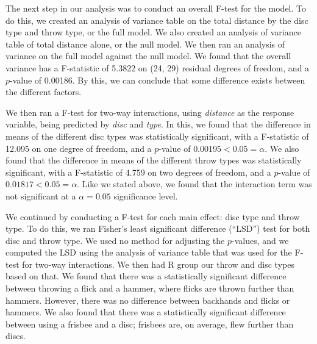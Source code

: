 \documentclass[letter,12pt]{article}
\begin{document}
  The next step in our analysis was to conduct an overall F-test for the model. To do this, we created an analysis of variance table on the total distance by the disc type and throw type, or the full model. We also created an analysis of variance table of total distance alone, or the null model. We then ran an analysis of variance on the full model against the null model. We found that the overall variance has a F-statistic of 5.3822 on (24, 29) residual degrees of freedom, and a $p$-value of 0.00186. By this, we can conclude that some difference exists between the different factors.\par
  We then ran a F-test for two-way interactions, using \textit{distance} as the response variable, being predicted by \textit{disc} and \textit{type}. In this, we found that the difference in means of the different disc types was statistically significant, with a F-statistic of 12.095 on one degree of freedom, and a $p$-value of $0.00195 < 0.05 = \alpha$. We also found that the difference in means of the different throw types was statistically significant, with a F-statistic of 4.759 on two degrees of freedom, and a $p$-value of $0.01817 < 0.05 = \alpha$. Like we stated above, we found that the interaction term was not significant at a $\alpha = 0.05$ significance level.\par
  We continued by conducting a F-test for each main effect: disc type and throw type. To do this, we ran Fisher’s least significant difference (“LSD”) test for both disc and throw type. We used no method for adjusting the $p$-values, and we computed the LSD using the analysis of variance table that was used for the F-test for two-way interactions. We then had R group our throw and disc types based on that. We found that there was a statistically significant difference between throwing a flick and a hammer, where flicks are thrown further than hammers. However, there was no difference between backhands and flicks or hammers. We also found that there was a statistically significant difference between using a frisbee and a disc; frisbees are, on average, flew further than discs.\par
	
\end{document}
